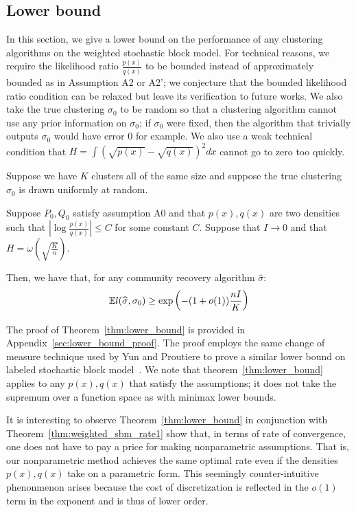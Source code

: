 
\subsection{Lower bound}


In this section, we give a lower bound on the performance of any clustering algorithms on the weighted stochastic block model. For technical reasons, we require the likelihood ratio $\frac{p(x)}{q(x)}$ to be bounded instead of approximately bounded as in Assumption A2 or A2'; we conjecture that the bounded likelihood ratio condition can be relaxed but leave its verification to future works. We also take the true clustering $\sigma_0$ to be random so that a clustering algorithm cannot use any prior information on $\sigma_0$; if $\sigma_0$ were fixed, then the algorithm that trivially outputs $\sigma_0$ would have error 0 for example. We also use a weak technical condition that $H = \int (\sqrt{p(x)} - \sqrt{q(x)} )^2 dx$ cannot go to zero too quickly.

\begin{theorem}
\label{thm:lower_bound}
Suppose we have $K$ clusters all of the same size and suppose the true clustering $\sigma_0$ is drawn uniformly at random. 

Suppose $P_0, Q_0$ satisfy assumption A0 and that $p(x), q(x)$ are two densities such that $\left| \log \frac{p(x)}{q(x)} \right| \leq C$ for some constant $C$. Suppose that $I \rightarrow 0$ and that $H = \omega \left( \sqrt{ \frac{K}{n} } \right)$.

Then, we have that, for any community recovery algorithm $\hat{\sigma}$:
\[
{\mathbb E} l(\widehat{\sigma}, \sigma_0) \geq \exp \left( - (1 + o(1)) \frac{ n I}{K} \right)
\]
\end{theorem}
The proof of Theorem~\ref{thm:lower_bound} is provided in Appendix~\ref{sec:lower_bound_proof}. The proof employs the same change of measure technique used by Yun and Proutiere to prove a similar lower bound on labeled stochastic block model~\cite{yun2016optimal}. We note that theorem~\ref{thm:lower_bound} applies to any $p(x), q(x)$ that satisfy the assumptions; it does not take the supremum over a function space as with minimax lower bounds. 

It is interesting to observe Theorem~\ref{thm:lower_bound} in conjunction with Theorem~\ref{thm:weighted_sbm_rate1} show that, in terms of rate of convergence, one does not have to pay a price for making nonparametric assumptions. That is, our nonparametric method achieves the same optimal rate even if the densities $p(x), q(x)$ take on a parametric form. This seemingly counter-intuitive phenonmenon arises because the cost of discretization is reflected in the $o(1)$ term in the exponent and is thus of lower order. 


